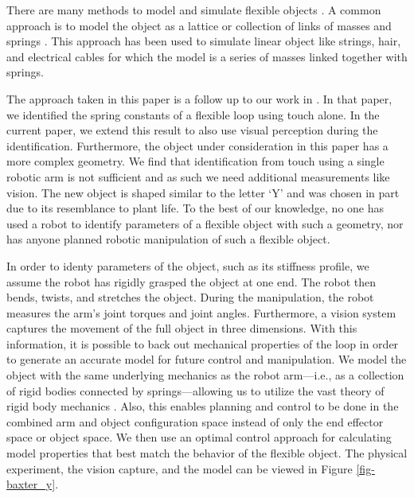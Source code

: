 \documentclass[runningheads,a4paper]{llncs}
\begin{document}
There are many methods to model and simulate flexible objects \cite{khalil_payeur,lang_etal}.  A common approach is to model the object as a lattice or collection of links of masses and springs \cite{sahari_etal,wakamatsu_etal,khalil_payeur}.  This approach has been used to simulate linear object like strings, hair, and electrical cables for which the model is a series of masses linked together with springs. %

The approach taken in this paper is a follow up to our work in \cite{caldwell_coleman_correll_iros}. In that paper, we identified the spring constants of a flexible loop using touch alone. In the current paper, we extend this result to also use visual perception during the identification. Furthermore, the object under consideration in this paper has a more complex geometry.  We find that identification from touch using a single robotic arm is not sufficient and as such we need additional measurements like vision.  The new object is shaped similar to the letter `Y' and was chosen in part due to its resemblance to plant life.  To the best of our knowledge, no one has used a robot to identify parameters of a flexible object with such a geometry, nor has anyone planned robotic manipulation of such a flexible object.

In order to identy parameters of the object, such as its stiffness profile, we assume the robot has rigidly grasped the object at one end. The robot then bends, twists, and stretches the object.  During the manipulation, the robot measures the arm's joint torques and joint angles.  Furthermore, a vision system captures the movement of the full object in three dimensions.  With this information, it is possible to back out mechanical properties of the loop in order to generate an accurate model for future control and manipulation. We model the object with the same underlying mechanics as the robot arm---i.e., as a collection of rigid bodies connected by springs---allowing us to utilize the vast theory of rigid body mechanics \cite{murray_li_sastry}. Also, this enables planning and control to be done in the combined arm and object configuration space instead of only the end effector space or object space.  We then use an optimal control approach for calculating model properties that best match the behavior of the flexible object. The physical experiment, the vision capture, and the model can be viewed in Figure \ref{fig-baxter_y}.
\end{document}
